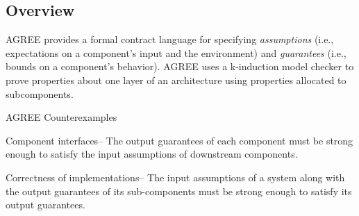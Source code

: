 \subsection{Overview}


AGREE provides a formal contract language for specifying \textit{assumptions} (i.e., expectations on a component's input and the environment) and \textit{guarantees} (i.e., bounds on a component's behavior). AGREE uses a k-induction model checker to prove properties about one layer of an architecture using properties allocated to subcomponents. 




AGREE Counterexamples





Component interfaces– The output guarantees of each component must be strong enough to satisfy the input assumptions of downstream components. 

Correctness of implementations– The input assumptions of a system along with the output guarantees of its sub-components must be strong enough to satisfy its output guarantees.






